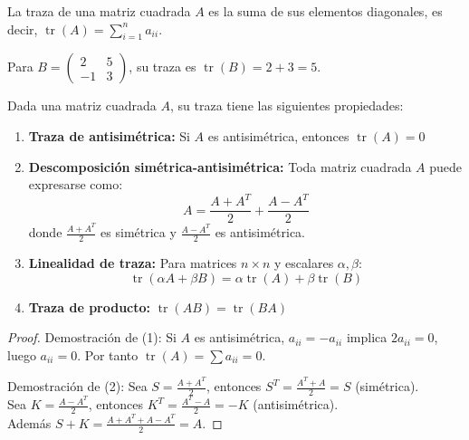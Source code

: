 \begin{definition} \label{def:traza}
La traza de una matriz cuadrada $A$ es la suma de sus elementos diagonales, es decir, \( \operatorname{tr}(A) = \sum_{i=1}^n a_{ii} .\)
\end{definition}

\begin{example} Para $B = \begin{pmatrix} 2 & 5 \\ -1 & 3 \end{pmatrix}$, su traza es $\operatorname{tr}(B) = 2 + 3 = 5$.
\end{example}

\begin{theorem}\label{thm:proptraza} Dada una matriz cuadrada $A$, su traza tiene las siguientes propiedades:
\begin{enumerate}
\item \textbf{Traza de antisimétrica:} Si $A$ es antisimétrica, entonces $\operatorname{tr}(A) = 0$
  
\item \textbf{Descomposición simétrica-antisimétrica:} Toda matriz cuadrada $A$ puede expresarse como:
\[
A = \frac{A + A^T}{2} + \frac{A - A^T}{2}
\]
donde $\frac{A + A^T}{2}$ es simétrica y $\frac{A - A^T}{2}$ es antisimétrica.

\item \textbf{Linealidad de traza:} Para matrices $n\times n$ y escalares $\alpha,\beta$:
\[
\operatorname{tr}(\alpha A + \beta B) = \alpha \operatorname{tr}(A) + \beta \operatorname{tr}(B)
\]

\item \textbf{Traza de producto:} $\operatorname{tr}(AB) = \operatorname{tr}(BA)$
\end{enumerate}
\end{theorem}

\begin{proof}
Demostración de (1): Si $A$ es antisimétrica, $a_{ii} = -a_{ii}$ implica $2a_{ii}=0$, luego $a_{ii}=0$. Por tanto $\operatorname{tr}(A) = \sum a_{ii} = 0$.

Demostración de (2): Sea $S = \frac{A + A^T}{2}$, entonces $S^T = \frac{A^T + A}{2} = S$ (simétrica). \\
Sea $K = \frac{A - A^T}{2}$, entonces $K^T = \frac{A^T - A}{2} = -K$ (antisimétrica). \\
Además $S + K = \frac{A + A^T + A - A^T}{2} = A$.
\end{proof}

